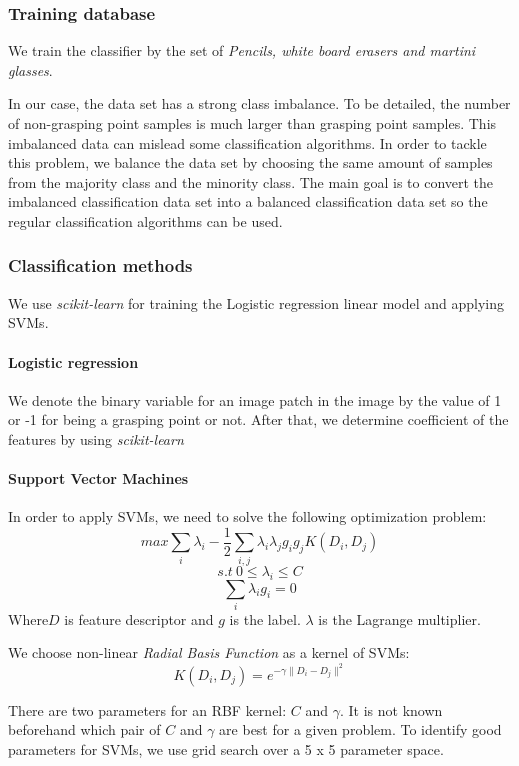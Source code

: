 \documentclass[a4paper, 10pt, conference]{ieeeconf}      %
\begin{document}
\subsubsection{Training database}
We train the classifier by the set of \textit{Pencils, white board erasers and martini glasses}. 

In our case, the data set has a strong class imbalance. To be detailed, the number of non-grasping point samples is much larger than grasping point samples. This imbalanced data  can mislead some classification algorithms. In order to tackle this problem, we balance the data set by choosing the same amount of samples from the majority class and the minority class. The main goal is to convert the imbalanced classification data set into a balanced classification data set so the regular classification algorithms can be used.
\subsubsection{Classification methods}
We use \textit{scikit-learn}\cite{c7} for training the Logistic regression linear model and applying SVMs.
\paragraph{Logistic regression}
We denote the binary variable for an image patch in the image by the value of 1 or -1 for being a grasping point or not. After that, we determine coefficient of the features by using \textit{scikit-learn}
\paragraph{Support Vector Machines}
In order to apply SVMs, we need to solve the following optimization problem:
$$max\sum_{i}\lambda_i-\frac{1}{2}\sum_{i,j}\lambda_i\lambda_j g_i g_jK(D_i,D_j)$$
$$s.t \ 0 \leq \lambda_i \leq C$$
$$\sum_i\lambda_ig_i=0$$
Where$D$ is feature descriptor and $g$ is the label. $\lambda$ is the Lagrange multiplier.

We choose non-linear \textit{Radial Basis Function} as a kernel of SVMs:
$$K(D_i,D_j)=e^{-\gamma\|D_i-D_j\|^2}$$ 

There are two parameters for an RBF kernel: $C$ and $\gamma$. It is not known beforehand which pair of $C$ and $\gamma$ are best for a given problem. To identify good parameters for SVMs, we use grid search\cite{c8} over a 5 x 5 parameter space.
\end{document}
